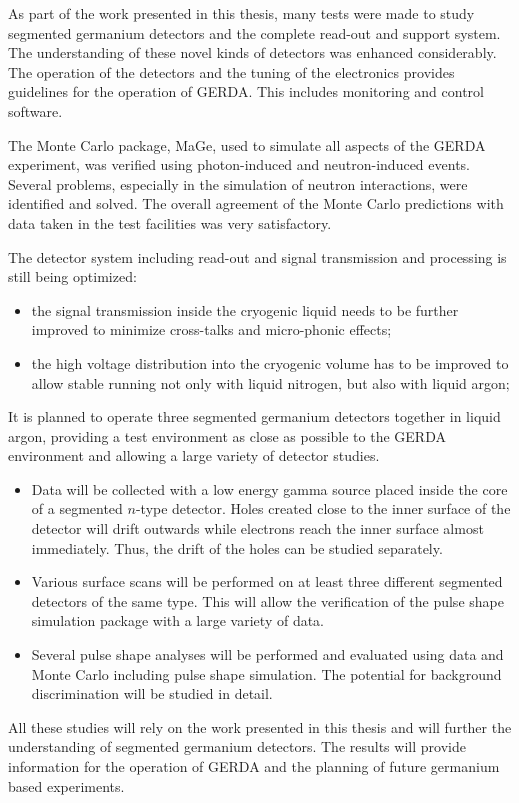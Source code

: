 As part of the work presented in this thesis, many tests were made to
study segmented germanium detectors and the complete read-out and
support system.  The understanding of these novel kinds of detectors
was enhanced considerably. The operation of the detectors and the
tuning of the electronics provides guidelines for the operation of
GERDA. This includes monitoring and control software.

The Monte Carlo package, MaGe, used to simulate all aspects of the
GERDA experiment, was verified using photon-induced and
neutron-induced events. Several problems, especially in the simulation
of neutron interactions, were identified and solved. The overall
agreement of the Monte Carlo predictions with data taken in the test
facilities was very satisfactory.

The detector system including read-out and signal transmission and
processing is still being optimized:
\begin{itemize} 
\item the signal transmission inside the cryogenic liquid needs to be
further improved to minimize cross-talks and micro-phonic effects;
\item the high voltage distribution into the cryogenic volume has to
be improved to allow stable running not only with liquid nitrogen, but
also with liquid argon;
\end{itemize}

It is planned to operate three segmented germanium detectors together
in liquid argon, providing a test environment as close as possible to
the GERDA environment and allowing a large variety of detector
studies.

\begin{itemize}
\item Data will be collected with a low energy gamma source placed
inside the core of a segmented $n$-type detector. Holes created close
to the inner surface of the detector will drift outwards while
electrons reach the inner surface almost immediately.  Thus, the drift
of the holes can be studied separately.
\item Various surface scans will be performed on at least three
different segmented detectors of the same type. This will allow the
verification of the pulse shape simulation package with a large
variety of data.
\item Several pulse shape analyses will be performed and evaluated
using data and Monte Carlo including pulse shape simulation. The
potential for background discrimination will be studied in detail.
\end{itemize} 
 
All these studies will rely on the work presented in this thesis and
will further the understanding of segmented germanium detectors. The
results will provide information for the operation of GERDA and the
planning of future germanium based experiments.
 
